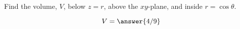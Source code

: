 \documentclass{ximera}
\author{David Guichard \and Neal Koblitz \and H. Jerome Keisler \and Albert Scheller \and Barry Balof \and Mike Wills \and Matthew Carr}
\begin{document}
\begin{exercise}





Find the volume, $V$, below $z=r$, above the $xy$-plane, and inside $r=\cos\theta$.
\begin{prompt}
\[
V=\answer{4/9}
\]
\end{prompt}



\end{exercise}
\end{document}

